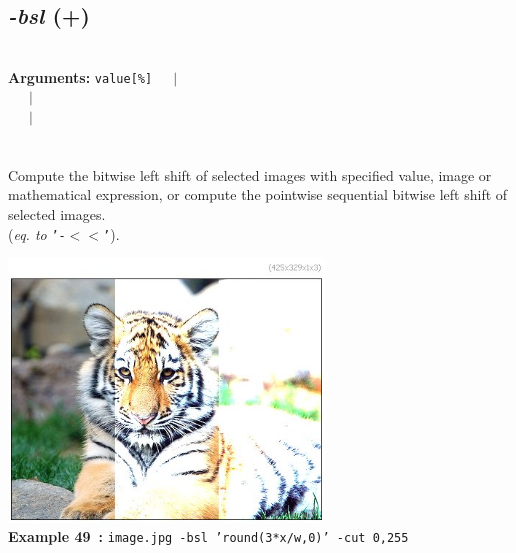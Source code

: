 \documentclass[a4paper,11pt,twoside]{book}
\begin{document}
\subsection{\emph{-bsl} (+)}\vspace*{-0.5em}
~\\\textbf{Arguments: } 
{\small \texttt{value[\%]}}~~~$|$\\
\hspace*{2.2cm}{\small \texttt{[image]}}~~~$|$\\
~~~$|$\\
\\~\\
Compute the bitwise left shift of selected images with specified value, image or
mathematical expression, or compute the pointwise sequential bitwise left shift of
selected images.
~\\(\emph{eq. to} {\small \texttt{'-$<$$<$'}}).
\begin{center}\includegraphics[keepaspectratio=true,height=7cm,width=\textwidth]{img/gmic_def49.jpg}\\
{\footnotesize \textbf{Example 49~:} \texttt{image.jpg -bsl 'round(3*x/w,0)' -cut 0,255}}
\end{center}
\end{document}
